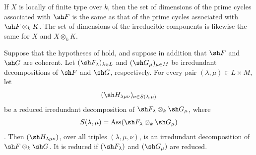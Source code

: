\begin{corollary}[4.2.8]
\label{IV.4.2.8}
If $X$ is locally of finite type over $k$, then the set of dimensions
of the prime cycles associated with $\sh F$ is the same as that of the
prime cycles associated with $\sh F\otimes_k K$.
The set of dimensions of the irreducible components is likewise the
same for $X$ and $X\otimes_k K$.
\end{corollary}

\begin{proposition}[4.2.9]
\label{IV.4.2.9}
Suppose that the hypotheses of  hold, and suppose in
addition that $\sh F$ and $\sh G$ are coherent.
Let $(\sh F_\lambda)_{\lambda\in L}$ and
$(\sh G_\mu)_{\mu\in M}$ be irredundant decompositions of $\sh F$ and
$\sh G$, respectively.
For every pair $(\lambda,\mu)\in L\times M$, let
\[
(\sh H_{\lambda\mu\nu})_{\nu\in S(\lambda,\mu)}
\]
be a reduced irredundant decomposition of
$\sh F_\lambda\otimes_k\sh G_\mu$, where
\[
S(\lambda,\mu)
=\operatorname{Ass}(\sh F_\lambda\otimes_k\sh G_\mu)
\]
.
Then $(\sh H_{\lambda\mu\nu})$, over all triples
$(\lambda,\mu,\nu)$, is an irredundant decomposition of
$\sh F\otimes_k\sh G$.
It is reduced if $(\sh F_\lambda)$ and $(\sh G_\mu)$ are reduced.
\end{proposition}

